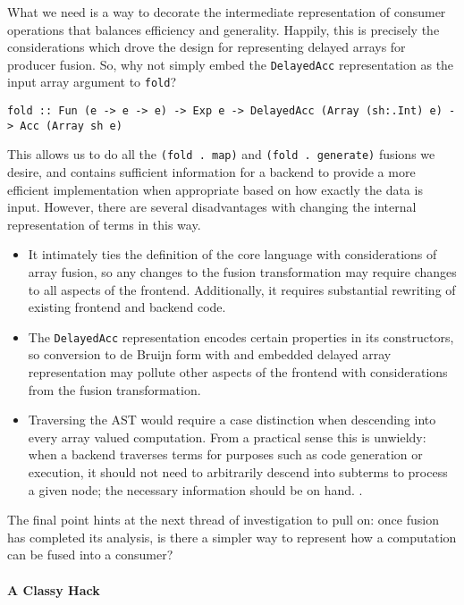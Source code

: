 What we need is a way to decorate the intermediate representation of consumer
operations that balances efficiency and generality. Happily, this is precisely
the considerations which drove the design for representing delayed arrays for
producer fusion. So, why not simply embed the \texttt{DelayedAcc} representation
as the input array argument to \texttt{fold}?
%
\begin{lstlisting}[style=haskell,numbers=none]
fold :: Fun (e -> e -> e) -> Exp e -> DelayedAcc (Array (sh:.Int) e) -> Acc (Array sh e)
\end{lstlisting}
%
This allows us to do all the \lstinline[style=inline]{(fold . map)} and
\lstinline[style=inline]{(fold . generate)} fusions we desire, and contains
sufficient information for a backend to provide a more efficient implementation
when appropriate based on how exactly the data is input. However, there are
several disadvantages with changing the internal representation of terms in this
way.
%
\begin{itemize}
    \item It intimately ties the definition of the core language with
        considerations of array fusion, so any changes to the fusion
        transformation may require changes to all aspects of the frontend.
        Additionally, it requires substantial rewriting of existing frontend and
        backend code.

    \item The \texttt{DelayedAcc} representation encodes certain properties in
        its constructors, so conversion to de Bruijn form with and embedded
        delayed array representation may pollute other aspects of the frontend
        with considerations from the fusion transformation.

    \item Traversing the AST would require a case distinction when descending
        into every array valued computation. From a practical sense this is
        unwieldy: when a backend traverses terms for purposes such as code
        generation or execution, it should not need to arbitrarily descend into
        subterms to process a given node; the necessary information should be on
        hand. .
\end{itemize}
%
The final point hints at the next thread of investigation to pull on: once
fusion has completed its analysis, is there a simpler way to represent how a
computation can be fused into a consumer?


\paragraph{A Classy Hack}

